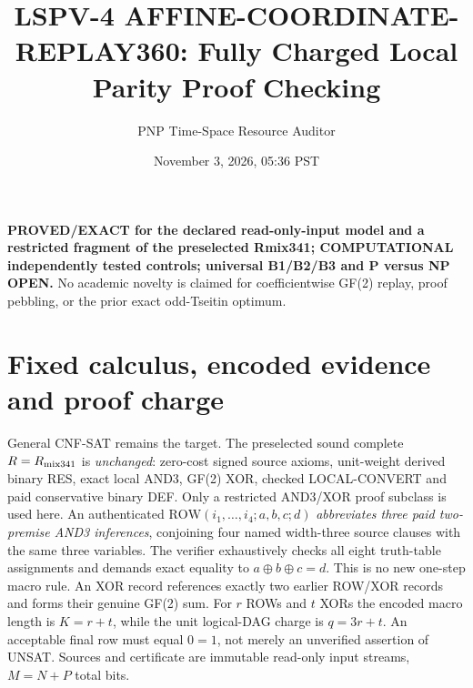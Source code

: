 \documentclass[11pt]{article}
\title{LSPV-4 AFFINE-COORDINATE-REPLAY360: Fully Charged Local Parity Proof Checking}
\author{PNP Time-Space Resource Auditor}
\date{November 3, 2026, 05:36 PST}
\begin{document}
\maketitle
\noindent\textbf{PROVED/EXACT for the declared read-only-input model and a restricted fragment of the preselected Rmix341; COMPUTATIONAL independently tested controls; universal B1/B2/B3 and P versus NP OPEN.} No academic novelty is claimed for coefficientwise GF(2) replay, proof pebbling, or the prior exact odd-Tseitin optimum.

\section{Fixed calculus, encoded evidence and proof charge}
General CNF-SAT remains the target. The preselected sound complete $R=R_{\rm mix341}$ is \emph{unchanged}: zero-cost signed source axioms, unit-weight derived binary RES, exact local AND3, GF(2) XOR, checked LOCAL-CONVERT and paid conservative binary DEF. Only a restricted AND3/XOR proof subclass is used here. An authenticated $\mathrm{ROW}(i_1,\ldots,i_4;a,b,c;d)$ \emph{abbreviates three paid two-premise AND3 inferences}, conjoining four named width-three source clauses with the same three variables. The verifier exhaustively checks all eight truth-table assignments and demands exact equality to $a\oplus b\oplus c=d$. This is no new one-step macro rule. An XOR record references exactly two earlier ROW/XOR records and forms their genuine GF(2) sum. For $r$ ROWs and $t$ XORs the encoded macro length is $K=r+t$, while the unit logical-DAG charge is $q=3r+t$. An acceptable final row must equal $0=1$, not merely an unverified assertion of UNSAT. Sources and certificate are immutable read-only input streams, $M=N+P$ total bits.
\end{document}
